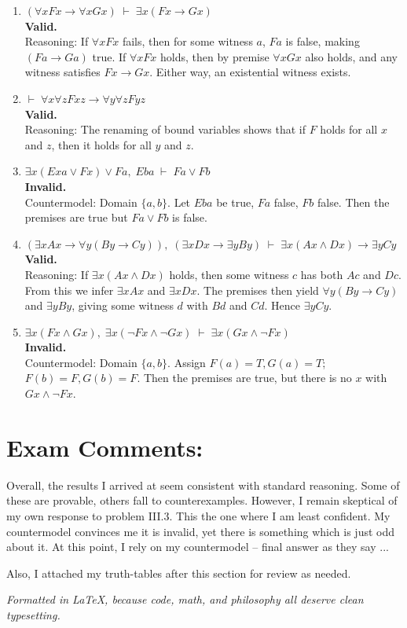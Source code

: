 \documentclass[12pt]{article}
\begin{document}
\begin{enumerate}[label=\arabic*.]

\item $(\forall x F x \to \forall x G x) \;\vdash\; \exists x (F x \to G x)$\\
\textbf{Valid.}\\
Reasoning: If $\forall x F x$ fails, then for some witness $a$, $F a$ is false, making $(F a \to G a)$ true. If $\forall x F x$ holds, then by premise $\forall x G x$ also holds, and any witness satisfies $F x \to G x$. Either way, an existential witness exists.

\item $\vdash\; \forall x \forall z F xz \to \forall y \forall z F yz$\\
\textbf{Valid.}\\
Reasoning: The renaming of bound variables shows that if $F$ holds for all $x$ and $z$, then it holds for all $y$ and $z$.

\item $\exists x(E x a \lor F x) \lor F a,\; E b a \;\vdash\; F a \lor F b$\\
\textbf{Invalid.}\\
Countermodel: Domain $\{a,b\}$. Let $Eba$ be true, $F a$ false, $F b$ false. Then the premises are true but $F a \lor F b$ is false.

\item $(\exists x A x \to \forall y (B y \to C y)),\; (\exists x D x \to \exists y B y) \;\vdash\; \exists x (A x \land D x) \to \exists y C y$\\
\textbf{Valid.}\\
Reasoning: If $\exists x(Ax \land Dx)$ holds, then some witness $c$ has both $A c$ and $D c$. From this we infer $\exists x A x$ and $\exists x D x$. The premises then yield $\forall y(By \to Cy)$ and $\exists y B y$, giving some witness $d$ with $B d$ and $C d$. Hence $\exists y C y$.

\item $\exists x(F x \land G x),\; \exists x(\neg F x \land \neg G x) \;\vdash\; \exists x(G x \land \neg F x)$\\
\textbf{Invalid.}\\
Countermodel: Domain $\{a,b\}$. Assign $F(a)=T, G(a)=T$; $F(b)=F, G(b)=F$. Then the premises are true, but there is no $x$ with $G x \land \neg F x$.

\end{enumerate}

\clearpage
\section*{Exam Comments:}
Overall, the results I arrived at seem consistent with standard reasoning. Some of these are provable, others fall to counterexamples. However, I remain skeptical of my own response to problem III.3. This the one where I am least confident. My countermodel convinces me it is invalid, yet there is something which is just odd about it. At this point, I rely on my countermodel -- final answer as they say ...

\bigskip
Also, I attached my truth-tables after this section for review as needed.

\bigskip
\noindent\textit{Formatted in LaTeX{}, because code, math, and philosophy all deserve clean typesetting.}
\end{document}

